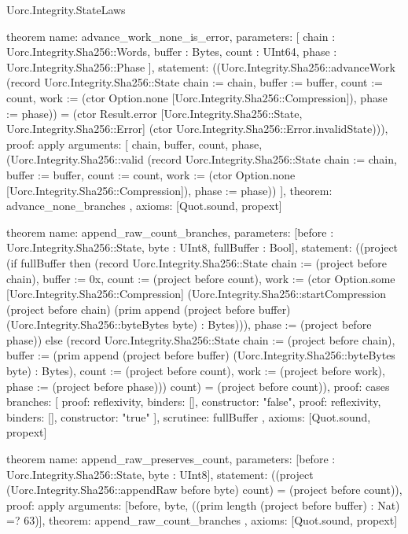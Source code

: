 \begin{lexlean}{Uorc.Integrity.StateLaws}
\begin{semanticmodule}
theorem{
  name: advance_work_none_is_error,
  parameters: [
    chain : Uorc.Integrity.Sha256::Words,
    buffer : Bytes,
    count : UInt64,
    phase : Uorc.Integrity.Sha256::Phase
  ],
  statement: ((Uorc.Integrity.Sha256::advanceWork (record Uorc.Integrity.Sha256::State {chain := chain, buffer := buffer, count := count, work := (ctor Option.none [Uorc.Integrity.Sha256::Compression]), phase := phase})) = (ctor Result.error [Uorc.Integrity.Sha256::State, Uorc.Integrity.Sha256::Error] (ctor Uorc.Integrity.Sha256::Error.invalidState))),
  proof: apply{
    arguments: [
      chain,
      buffer,
      count,
      phase,
      (Uorc.Integrity.Sha256::valid (record Uorc.Integrity.Sha256::State {chain := chain, buffer := buffer, count := count, work := (ctor Option.none [Uorc.Integrity.Sha256::Compression]), phase := phase}))
    ],
    theorem: advance_none_branches
  },
  axioms: [Quot.sound, propext]
}

theorem{
  name: append_raw_count_branches,
  parameters: [before : Uorc.Integrity.Sha256::State, byte : UInt8, fullBuffer : Bool],
  statement: ((project (if fullBuffer then (record Uorc.Integrity.Sha256::State {chain := (project before chain), buffer := 0x, count := (project before count), work := (ctor Option.some [Uorc.Integrity.Sha256::Compression] (Uorc.Integrity.Sha256::startCompression (project before chain) (prim append (project before buffer) (Uorc.Integrity.Sha256::byteBytes byte) : Bytes))), phase := (project before phase)}) else (record Uorc.Integrity.Sha256::State {chain := (project before chain), buffer := (prim append (project before buffer) (Uorc.Integrity.Sha256::byteBytes byte) : Bytes), count := (project before count), work := (project before work), phase := (project before phase)})) count) = (project before count)),
  proof: cases{
    branches: [
      {proof: reflexivity{}, binders: [], constructor: "false"},
      {proof: reflexivity{}, binders: [], constructor: "true"}
    ],
    scrutinee: fullBuffer
  },
  axioms: [Quot.sound, propext]
}

theorem{
  name: append_raw_preserves_count,
  parameters: [before : Uorc.Integrity.Sha256::State, byte : UInt8],
  statement: ((project (Uorc.Integrity.Sha256::appendRaw before byte) count) = (project before count)),
  proof: apply{
    arguments: [before, byte, ((prim length (project before buffer) : Nat) =? 63)],
    theorem: append_raw_count_branches
  },
  axioms: [Quot.sound, propext]
}


\end{semanticmodule}
\end{lexlean}

